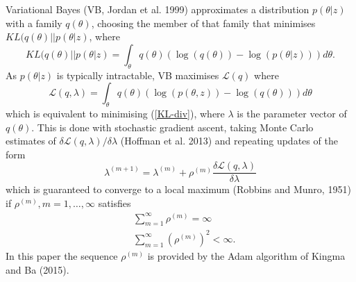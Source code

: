 \documentclass[12pt,a4paper]{article}\usepackage[]{graphicx}\usepackage[]{color}
\begin{document}
Variational Bayes (VB, Jordan et al. 1999) approximates a distribution $p(\theta | z)$ with a family $q(\theta)$, choosing the member of that family that minimises $KL(q(\theta) || p(\theta | z)$, where
\begin{equation}
\label{KL-div}
KL(q(\theta) || p(\theta | z) = \int_{\theta} q(\theta) \left(\log(q(\theta)) - \log(p(\theta | z))\right) d\theta.
\end{equation}
As $p(\theta | z)$ is typically intractable, VB maximises $\mathcal{L}(q)$ where
\begin{equation}
\label{ELBO}
\mathcal{L}(q, \lambda) = \int_{\theta} q(\theta) \left(\log(p(\theta, z)) - \log(q(\theta))\right) d\theta
\end{equation}
which is equivalent to minimising (\ref{KL-div}), where $\lambda$ is the parameter vector of $q(\theta)$.
This is done with stochastic gradient ascent, taking Monte Carlo estimates of $\delta\mathcal{L}(q, \lambda) / \delta \lambda$ (Hoffman et al. 2013)
and repeating updates of the form
\begin{equation}
\label{gradientAscent}
\lambda^{(m+1)} = \lambda^{(m)} + \rho^{(m)} \frac{\delta\mathcal{L}(q, \lambda)}{\delta \lambda} 
\end{equation}
which is guaranteed to converge to a local maximum (Robbins and Munro, 1951) if $\rho^{(m)}, m = 1, \dots, \infty$ satisfies
\begin{align}
&\sum_{m=1}^{\infty} \rho^{(m)} =  \infty \\
&\sum_{m=1}^{\infty} (\rho^{(m)})^2 <  \infty.
\end{align}
In this paper the sequence $\rho^{(m)}$ is provided by the Adam algorithm of Kingma and Ba (2015).
\end{document}
